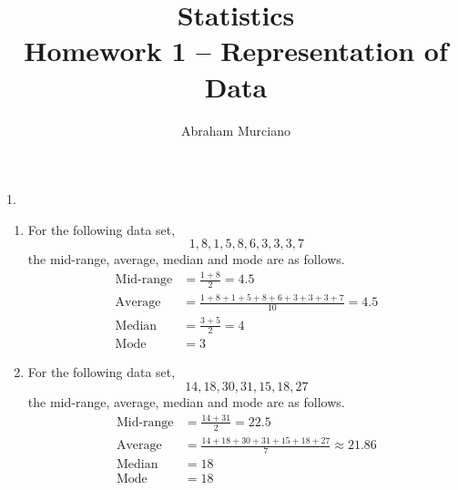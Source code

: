 \documentclass[fleqn]{article}
\title{
	Statistics \\
	\medskip
	\large Homework 1 -- Representation of Data
}
\author{Abraham Murciano}
\begin{document}
\maketitle

\begin{answers}

	\item[1.]
	\begin{enumerate}
		\item %
		For the following data set,
		\[1,8,1,5,8,6,3,3,3,7\]
		the mid-range, average, median and mode are as follows.
		\begin{align*}
			\text{Mid-range} &= \frac{1+8}{2} = 4.5 \\
			\text{Average} &= \frac{1+8+1+5+8+6+3+3+3+7}{10} = 4.5 \\
			\text{Median} &= \frac{3+5}{2} = 4 \\
			\text{Mode} &= 3
		\end{align*}

		\item %
		For the following data set,
		\[14,18,30,31,15,18,27\]
		the mid-range, average, median and mode are as follows.
		\begin{align*}
			\text{Mid-range} &= \frac{14+31}{2} = 22.5 \\
			\text{Average} &= \frac{14+18+30+31+15+18+27}{7} \approx 21.86 \\
			\text{Median} &= 18 \\
			\text{Mode} &= 18
		\end{align*}
	\end{enumerate}


\end{answers}
\end{document}
